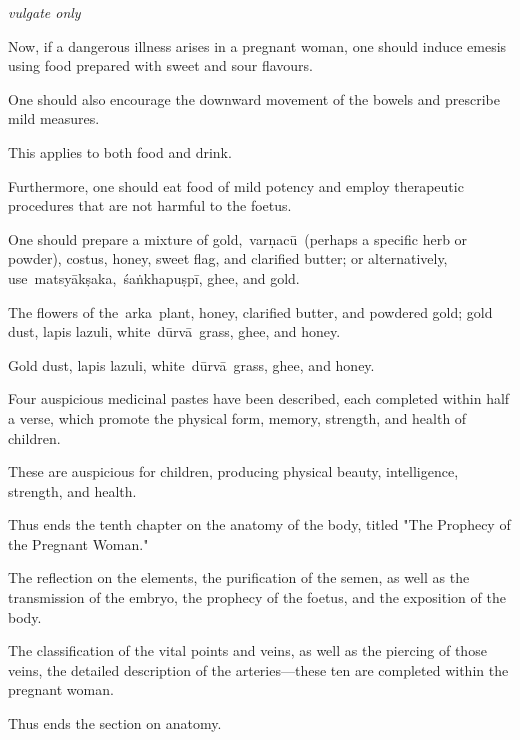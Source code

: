 \begin{translation}
\begin{tt}
\item[66] \emph{vulgate only}

\item[67]

Now, if a dangerous illness arises in a pregnant woman, one should
induce emesis using food prepared with sweet and sour flavours.

One should also encourage the downward movement of the bowels and
prescribe mild measures.

This applies to both food and drink.

Furthermore, one should eat food of mild potency and employ therapeutic
procedures that are not harmful to the foetus.

\item[68]

One should prepare a mixture of gold,~\gls{varṇacū}~(perhaps a specific
herb or powder), costus, honey, sweet flag, and clarified butter; or
alternatively, use~\gls{matsyākṣaka},~\gls{śaṅkhapuṣpī}, ghee, and
gold.

\item[69]

The flowers of the~\gls{arka}~plant, honey, clarified butter, and
powdered gold; gold dust, lapis lazuli, white~\gls{dūrvā}~grass, ghee,
and honey.

Gold dust, lapis lazuli, white~\gls{dūrvā}~grass, ghee, and honey.

\item[70]

Four auspicious medicinal pastes have been described, each completed
within half a verse, which promote the physical form, memory, strength,
and health of children.

These are auspicious for children, producing physical beauty,
intelligence, strength, and health.

\item[70.1]

Thus ends the tenth chapter on the anatomy of the body, titled "The
Prophecy of the Pregnant Woman."

The reflection on the elements, the purification of the semen, as well
as the transmission of the embryo, the prophecy of the foetus, and the
exposition of the body.

\item[70.2]

The classification of the vital points and veins, as well as the
piercing of those veins, the detailed description of the
arteries---these ten are completed within the pregnant woman.

Thus ends the section on anatomy.

\end{tt}
\end{translation}